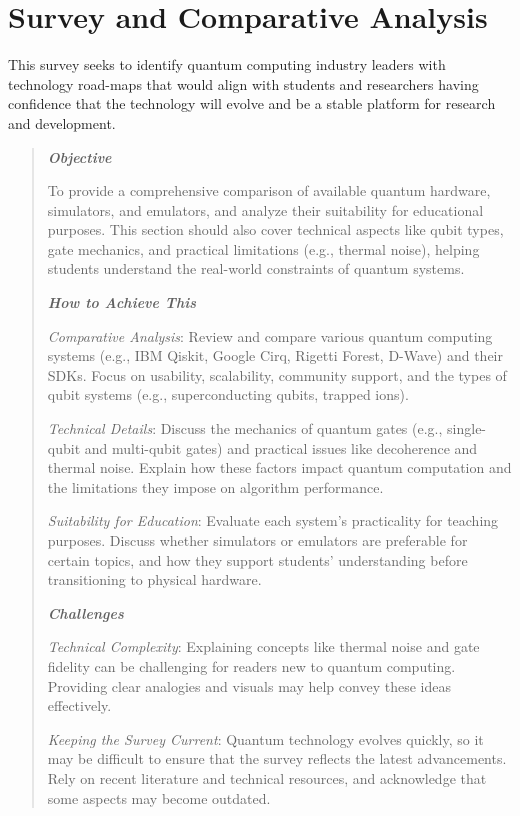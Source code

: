 \section{Survey and Comparative Analysis}


This survey seeks to identify quantum computing industry leaders with technology road-maps that would align with students
and researchers having confidence that the technology will evolve and be a stable platform for research and development.

\begin{quote}\itshape
\textbf{\emph{Objective}}

To provide a comprehensive comparison of available quantum hardware, simulators, and emulators, and analyze their suitability for educational purposes. This section should also cover technical aspects like qubit types, gate mechanics, and practical limitations (e.g., thermal noise), helping students understand the real-world constraints of quantum systems.

\textbf{\emph{How to Achieve This}}

\emph{Comparative Analysis}: Review and compare various quantum computing systems (e.g., IBM Qiskit, Google Cirq, Rigetti Forest, D-Wave) and their SDKs. Focus on usability, scalability, community support, and the types of qubit systems (e.g., superconducting qubits, trapped ions).
      
\emph{Technical Details}: Discuss the mechanics of quantum gates (e.g., single-qubit and multi-qubit gates) and practical issues like decoherence and thermal noise. Explain how these factors impact quantum computation and the limitations they impose on algorithm performance.
    
\emph{Suitability for Education}: Evaluate each system’s practicality for teaching purposes. Discuss whether simulators or emulators are preferable for certain topics, and how they support students’ understanding before transitioning to physical hardware.

\textbf{\emph{Challenges}}

\emph{Technical Complexity}: Explaining concepts like thermal noise and gate fidelity can be challenging for readers new to quantum computing. Providing clear analogies and visuals may help convey these ideas effectively.
    
\emph{Keeping the Survey Current}: Quantum technology evolves quickly, so it may be difficult to ensure that the survey reflects the latest advancements. Rely on recent literature and technical resources, and acknowledge that some aspects may become outdated.
\end{quote}\ignorespacesafterend
    
